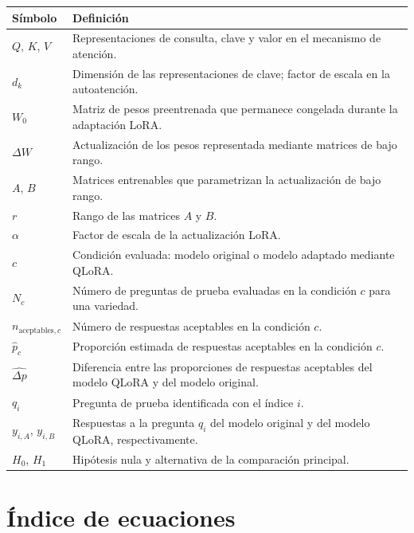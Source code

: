 \begin{table}[H]
\centering
\small
\begin{tabularx}{\textwidth}{@{}P{3.2cm}L@{}}
\toprule
{}
\textbf{Símbolo} & \textbf{Definición} \\
\midrule
$Q$, $K$, $V$ & Representaciones de consulta, clave y valor en el mecanismo de atención. \\
$d_k$ & Dimensión de las representaciones de clave; factor de escala en la autoatención. \\
$W_0$ & Matriz de pesos preentrenada que permanece congelada durante la adaptación LoRA. \\
$\Delta W$ & Actualización de los pesos representada mediante matrices de bajo rango. \\
$A$, $B$ & Matrices entrenables que parametrizan la actualización de bajo rango. \\
$r$ & Rango de las matrices $A$ y $B$. \\
$\alpha$ & Factor de escala de la actualización LoRA. \\
$c$ & Condición evaluada: modelo original o modelo adaptado mediante QLoRA. \\
$N_c$ & Número de preguntas de prueba evaluadas en la condición $c$ para una variedad. \\
$n_{\mathrm{aceptables},c}$ & Número de respuestas aceptables en la condición $c$. \\
$\widehat{p}_c$ & Proporción estimada de respuestas aceptables en la condición $c$. \\
$\widehat{\Delta p}$ & Diferencia entre las proporciones de respuestas aceptables del modelo QLoRA y del modelo original. \\
$q_i$ & Pregunta de prueba identificada con el índice $i$. \\
$y_{i,A}$, $y_{i,B}$ & Respuestas a la pregunta $q_i$ del modelo original y del modelo QLoRA, respectivamente. \\
$H_0$, $H_1$ & Hipótesis nula y alternativa de la comparación principal. \\
\bottomrule
\end{tabularx}
\end{table}

\clearpage
{}
{}
\chapter*{Índice de ecuaciones}

